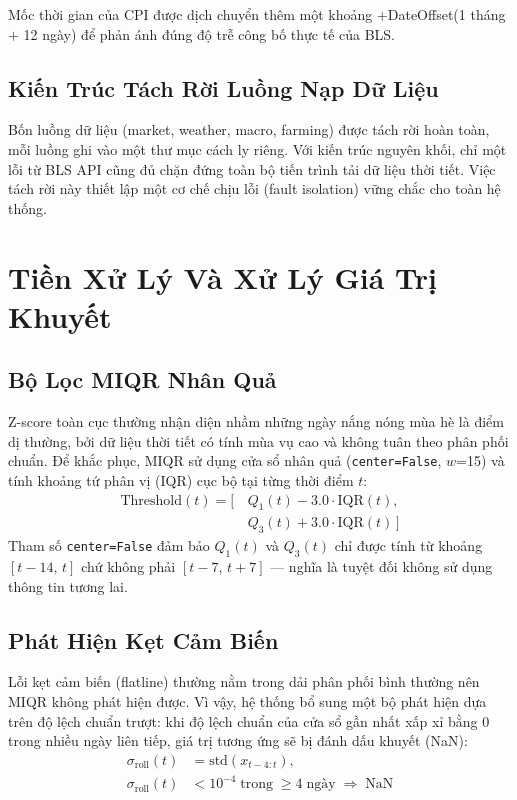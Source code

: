 \documentclass[conference]{IEEEtran}
\begin{document}
Mốc thời gian của CPI được dịch chuyển thêm một khoảng $+$DateOffset(1 tháng
$+$ 12 ngày) để phản ánh đúng độ trễ công bố thực tế của BLS.

\subsection{Kiến Trúc Tách Rời Luồng Nạp Dữ Liệu}

Bốn luồng dữ liệu (market, weather, macro, farming) được tách rời hoàn toàn,
mỗi luồng ghi vào một thư mục cách ly riêng. Với kiến trúc nguyên khối, chỉ
một lỗi từ BLS API cũng đủ chặn đứng toàn bộ tiến trình tải dữ liệu thời
tiết. Việc tách rời này thiết lập một cơ chế chịu lỗi (fault isolation) vững
chắc cho toàn hệ thống.

\section{Tiền Xử Lý Và Xử Lý Giá Trị Khuyết}

\subsection{Bộ Lọc MIQR Nhân Quả}

Z-score toàn cục thường nhận diện nhầm những ngày nắng nóng mùa hè là điểm dị
thường, bởi dữ liệu thời tiết có tính mùa vụ cao và không tuân theo phân phối
chuẩn. Để khắc phục, MIQR sử dụng cửa sổ nhân quả (\texttt{center=False},
$w$=15) và tính khoảng tứ phân vị (IQR) cục bộ tại từng thời điểm $t$:
\begin{equation}
\begin{aligned}
\text{Threshold}(t) = \bigl[\,
  &Q_1(t) - 3.0\cdot\text{IQR}(t),\\[-1pt]
  &Q_3(t) + 3.0\cdot\text{IQR}(t)\,\bigr]
\end{aligned}
\label{eq:miqr}
\end{equation}
Tham số \texttt{center=False} đảm bảo $Q_1(t)$ và $Q_3(t)$ chỉ được tính từ
khoảng $[t{-}14,\,t]$ chứ không phải $[t{-}7,\,t{+}7]$ --- nghĩa là tuyệt đối
không sử dụng thông tin tương lai.

\subsection{Phát Hiện Kẹt Cảm Biến}

Lỗi kẹt cảm biến (flatline) thường nằm trong dải phân phối bình thường nên
MIQR không phát hiện được. Vì vậy, hệ thống bổ sung một bộ phát hiện dựa trên
độ lệch chuẩn trượt: khi độ lệch chuẩn của cửa sổ gần nhất xấp xỉ bằng 0
trong nhiều ngày liên tiếp, giá trị tương ứng sẽ bị đánh dấu khuyết (NaN):
\begin{equation}
\begin{aligned}
\sigma_\text{roll}(t) &= \text{std}(x_{t-4:t}), \\
\sigma_\text{roll}(t) &< 10^{-4}\;\text{trong}\; \geq 4\;\text{ngày}
  \;\Rightarrow\; \text{NaN}
\end{aligned}
\label{eq:flatline}
\end{equation}
\end{document}
